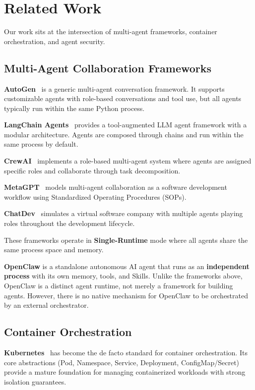 \section{Related Work}
\label{sec:related_work}

Our work sits at the intersection of multi-agent frameworks, container orchestration, and agent security.

\subsection{Multi-Agent Collaboration Frameworks}

\textbf{AutoGen}~\citep{wu2023autogen} is a generic multi-agent conversation framework. It supports customizable agents with role-based conversations and tool use, but all agents typically run within the same Python process.

\textbf{LangChain Agents}~\citep{langchain} provides a tool-augmented LLM agent framework with a modular architecture. Agents are composed through chains and run within the same process by default.

\textbf{CrewAI}~\citep{crewai} implements a role-based multi-agent system where agents are assigned specific roles and collaborate through task decomposition.

\textbf{MetaGPT}~\citep{hong2024metagpt} models multi-agent collaboration as a software development workflow using Standardized Operating Procedures (SOPs).

\textbf{ChatDev}~\citep{qian2024chatdev} simulates a virtual software company with multiple agents playing roles throughout the development lifecycle.

These frameworks operate in \textbf{Single-Runtime} mode where all agents share the same process space and memory.

\textbf{OpenClaw} is a standalone autonomous AI agent that runs as an \textbf{independent process} with its own memory, tools, and Skills. Unlike the frameworks above, OpenClaw is a distinct agent runtime, not merely a framework for building agents. However, there is no native mechanism for OpenClaw to be orchestrated by an external orchestrator.

\subsection{Container Orchestration}

\textbf{Kubernetes}~\citep{brett2015kubernetes} has become the de facto standard for container orchestration. Its core abstractions (Pod, Namespace, Service, Deployment, ConfigMap/Secret) provide a mature foundation for managing containerized workloads with strong isolation guarantees.

